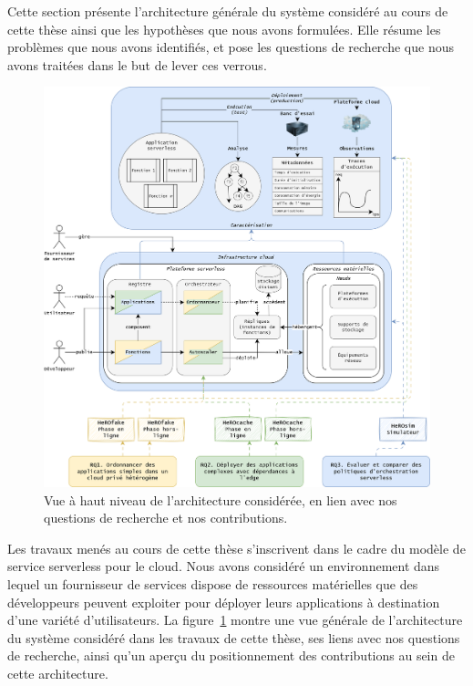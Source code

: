 Cette section présente l'architecture générale du système considéré au cours de cette thèse ainsi que les hypothèses que nous avons formulées. Elle résume les problèmes que nous avons identifiés, et pose les questions de recherche que nous avons traitées dans le but de lever ces verrous.

\begin{figure}[!ht]
    \centering
    \includegraphics[width=\textwidth]{1_Introduction/figures/architecture.png}
	\caption{Vue à haut niveau de l'architecture considérée, en lien avec nos questions de recherche et nos contributions.}
	\label{fig:intro-architecture}
\end{figure}

Les travaux menés au cours de cette thèse s'inscrivent dans le cadre du modèle de service serverless pour le cloud. Nous avons considéré un environnement dans lequel un fournisseur de services dispose de ressources matérielles que des développeurs peuvent exploiter pour déployer leurs applications à destination d'une variété d'utilisateurs. %
La figure~\ref{fig:intro-architecture} montre une vue générale de l'architecture du système considéré dans les travaux de cette thèse, ses liens avec nos questions de recherche, ainsi qu'un aperçu du positionnement des contributions au sein de cette architecture.

